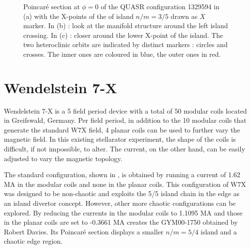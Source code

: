 \begin{figure}[H]
\begin{subfigure}[c]{0.44\textwidth}
        \caption{}
        \label{fig:turn-1329594}
    \end{subfigure}
    \caption{Poincaré section at $\phi=0$ of the QUASR configuration 1329594 in (a) with the X-points of the of island $n/m = 3/5$ drawn as $X$ marker. In (b) : look at the manifold structure around the left island crossing. In (c) : closer around the lower X-point of the island. The two heteroclinic orbits are indicated by distinct markers : circles and crosses. The inner ones are coloured in blue, the outer ones in red.}
    \label{fig:pmt-1329594}
\end{figure}

\section{Wendelstein 7-X}\label{sec:w7x}

Wendelstein 7-X is a 5 field period device with a total of 50 modular coils located in Greifswald, Germany. Per field period, in addition to the 10 modular coils that generate the standard W7X field, 4 planar coils can be used to further vary the magnetic field. In this existing stellarator experiment, the shape of the coils is difficult, if not impossible, to alter. The current, on the other hand, can be easily adjusted to vary the magnetic topology.

The standard configuration, shown in , is obtained by running a current of 1.62 MA in the modular coils and none in the planar coils. This configuration of W7X was designed to be non-chaotic and exploits the 5/5 island chain in the edge as an island divertor concept. However, other more chaotic configurations can be explored. By reducing the currents in the modular coils to 1.1095 MA and those in the planar coils are set to -0.3661 MA creates the GYM00-1750 obtained by Robert Davies. Its Poincar\'e section  displays a smaller $n/m = 5/4$ island and a chaotic edge region.

